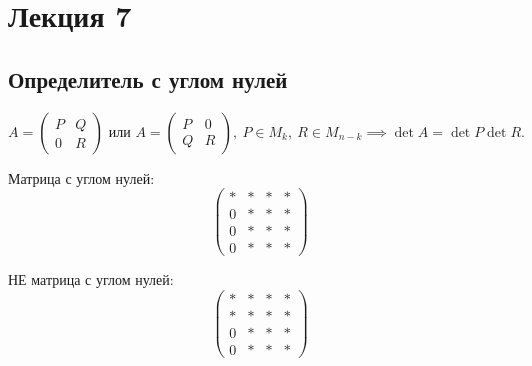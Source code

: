 \section{Лекция 7}

\subsection{Определитель с углом нулей}

\begin{proposal}
    \begin{equation*}
        A = \left(
            \begin{array}{c|c}
                P & Q \\
                \hline
                0 & R
            \end{array}
        \right) \text{ или } A =
        \left(
            \begin{array}{c|c}
                P & 0 \\
                \hline
                Q & R
            \end{array}
        \right), \ P \in M_k, \ R \in M_{n-k} \implies \det A = \det P \det R
    .\end{equation*}
\end{proposal}

Матрица с углом нулей:
\begin{equation*}
    \left(
        \begin{array}{c|ccc}
            * & * & * & * \\
            \hline
            0 & * & * & * \\
            0 & * & * & * \\
            0 & * & * & *
        \end{array}
    \right)
\end{equation*}

НЕ матрица с углом нулей:
\begin{equation*}
    \left(
        \begin{array}{c|ccc}
            * & * & * & * \\
            * & * & * & * \\
            \hline
            0 & * & * & * \\
            0 & * & * & *
        \end{array}
    \right)
\end{equation*}

